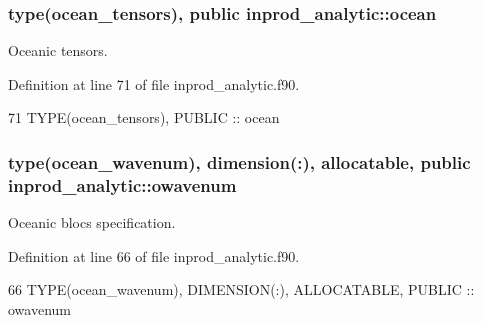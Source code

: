 \subsubsection[{\texorpdfstring{ocean}{ocean}}]{\setlength{\rightskip}{0pt plus 5cm}type({\bf ocean\+\_\+tensors}), public inprod\+\_\+analytic\+::ocean}\hypertarget{namespaceinprod__analytic_ac691a1258fb0a341e2ba5b4811be1c0b}{}\label{namespaceinprod__analytic_ac691a1258fb0a341e2ba5b4811be1c0b}


Oceanic tensors. 



Definition at line 71 of file inprod\+\_\+analytic.\+f90.


\begin{DoxyCode}
71   \textcolor{keywordtype}{TYPE}(ocean\_tensors), \textcolor{keywordtype}{PUBLIC} :: ocean
\end{DoxyCode}
\subsubsection[{\texorpdfstring{owavenum}{owavenum}}]{\setlength{\rightskip}{0pt plus 5cm}type({\bf ocean\+\_\+wavenum}), dimension(\+:), allocatable, public inprod\+\_\+analytic\+::owavenum}\hypertarget{namespaceinprod__analytic_a7273713c6b1a079e1c653e8b8d2fe089}{}\label{namespaceinprod__analytic_a7273713c6b1a079e1c653e8b8d2fe089}


Oceanic blocs specification. 



Definition at line 66 of file inprod\+\_\+analytic.\+f90.


\begin{DoxyCode}
66   \textcolor{keywordtype}{TYPE}(ocean\_wavenum), \textcolor{keywordtype}{DIMENSION(:)}, \textcolor{keywordtype}{ALLOCATABLE}, \textcolor{keywordtype}{PUBLIC} :: owavenum 
\end{DoxyCode}
